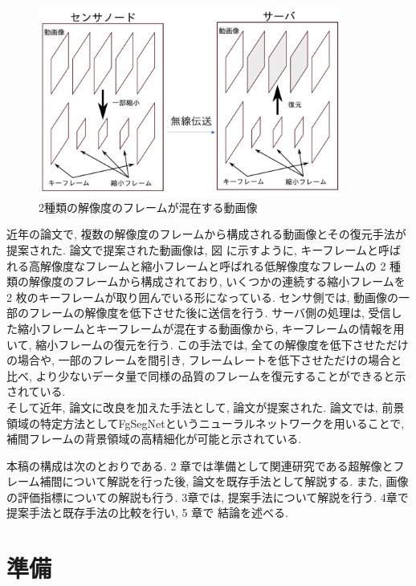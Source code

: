 \documentclass[a4paper,12pt]{jsreport}
\begin{document}
\begin{figure}[h]
  \begin{center}
    \includegraphics[width=10cm]{./key_thin_frames.png}
    \caption{2種類の解像度のフレームが混在する動画像}
  \end{center}
\end{figure}

近年の論文\cite{Uesaka}で, 複数の解像度のフレームから構成される動画像とその復元手法が提案された. 論文\cite{Uesaka}で提案された動画像は, 図 {}に示すように, キーフレームと呼ばれる高解像度なフレームと縮小フレームと呼ばれる低解像度なフレームの 2 種類の解像度のフレームから構成されており, いくつかの連続する縮小フレームを 2 枚のキーフレームが取り囲んでいる形になっている. センサ側では, 動画像の一部のフレームの解像度を低下させた後に送信を行う. サーバ側の処理は, 受信した縮小フレームとキーフレームが混在する動画像から, キーフレームの情報を用いて, 縮小フレームの復元を行う. この手法では, 全ての解像度を低下させただけの場合や, 一部のフレームを間引き, フレームレートを低下させただけの場合と比べ, より少ないデータ量で同様の品質のフレームを復元することができると示されている.\\
そして近年, 論文\cite{Uesaka}に改良を加えた手法として, 論文\cite{Ukihashi}が提案された. 論文\cite{Ukihashi}では, 前景領域の特定方法としてFgSegNetというニューラルネットワークを用いることで, 補間フレームの背景領域の高精細化が可能と示されている.

本稿の構成は次のとおりである. 2 章では準備として関連研究である超解像とフレーム補間について解説を行った後, 論文\cite{Ukihashi}を既存手法として解説する. また, 画像の評価指標についての解説も行う.  3章では, 提案手法について解説を行う. 4章で提案手法と既存手法の比較を行い, 5 章で 結論を述べる.



\chapter{準備}
\end{document}
